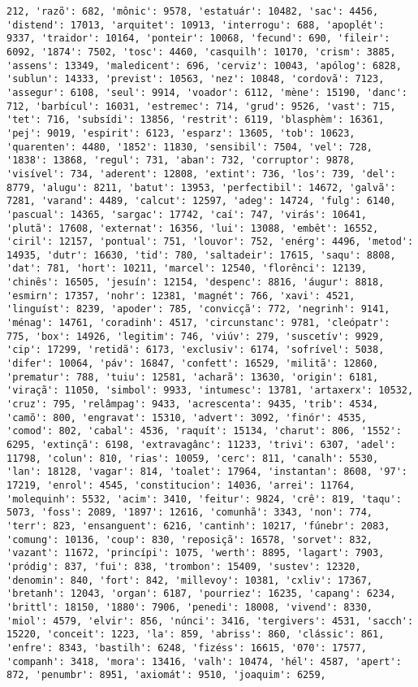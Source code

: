\begin{Verbatim}[commandchars=\\\{\}]
212, 'razõ': 682, 'mônic': 9578, 'estatuár': 10482, 'sac': 4456, 'distend': 17013, 'arquitet': 10913, 'interrogu': 688, 'apoplét': 9337, 'traidor': 10164, 'ponteir': 10068, 'fecund': 690, 'fileir': 6092, '1874': 7502, 'tosc': 4460, 'casquilh': 10170, 'crism': 3885, 'assens': 13349, 'maledicent': 696, 'cerviz': 10043, 'apólog': 6828, 'sublun': 14333, 'previst': 10563, 'nez': 10848, 'cordovã': 7123, 'assegur': 6108, 'seul': 9914, 'voador': 6112, 'mène': 15190, 'danc': 712, 'barbícul': 16031, 'estremec': 714, 'grud': 9526, 'vast': 715, 'tet': 716, 'subsídi': 13856, 'restrit': 6119, 'blasphèm': 16361, 'pej': 9019, 'espirit': 6123, 'esparz': 13605, 'tob': 10623, 'quarenten': 4480, '1852': 11830, 'sensibil': 7504, 'vel': 728, '1838': 13868, 'regul': 731, 'aban': 732, 'corruptor': 9878, 'visível': 734, 'aderent': 12808, 'extint': 736, 'los': 739, 'del': 8779, 'alugu': 8211, 'batut': 13953, 'perfectibil': 14672, 'galvã': 7281, 'varand': 4489, 'calcut': 12597, 'adeg': 14724, 'fulg': 6140, 'pascual': 14365, 'sargac': 17742, 'caí': 747, 'virás': 10641, 'plutã': 17608, 'externat': 16356, 'lui': 13088, 'embêt': 16552, 'ciril': 12157, 'pontual': 751, 'louvor': 752, 'enérg': 4496, 'metod': 14935, 'dutr': 16630, 'tid': 780, 'saltadeir': 17615, 'saqu': 8808, 'dat': 781, 'hort': 10211, 'marcel': 12540, 'florênci': 12139, 'chinês': 16505, 'jesuín': 12154, 'despenc': 8816, 'áugur': 8818, 'esmirn': 17357, 'nohr': 12381, 'magnét': 766, 'xavi': 4521, 'linguíst': 8239, 'apoder': 785, 'convicçã': 772, 'negrinh': 9141, 'ménag': 14761, 'coradinh': 4517, 'circunstanc': 9781, 'cleópatr': 775, 'box': 14926, 'legitim': 746, 'viúv': 279, 'suscetív': 9929, 'cip': 17299, 'retidã': 6173, 'exclusiv': 6174, 'sofrível': 5038, 'difer': 10064, 'páv': 16847, 'confett': 16529, 'militã': 12860, 'prematur': 788, 'tuiu': 12581, 'acharã': 13630, 'origin': 6181, 'viraçã': 11050, 'simbol': 9933, 'intumesc': 13781, 'artaxerx': 10532, 'cruz': 795, 'relâmpag': 9433, 'acrescenta': 9435, 'trib': 4534, 'camõ': 800, 'engravat': 15310, 'advert': 3092, 'finór': 4535, 'comod': 802, 'cabal': 4536, 'raquít': 15134, 'charut': 806, '1552': 6295, 'extinçã': 6198, 'extravagânc': 11233, 'trivi': 6307, 'adel': 11798, 'colun': 810, 'rias': 10059, 'cerc': 811, 'canalh': 5530, 'lan': 18128, 'vagar': 814, 'toalet': 17964, 'instantan': 8608, '97': 17219, 'enrol': 4545, 'constitucion': 14036, 'arrei': 11764, 'molequinh': 5532, 'acim': 3410, 'feitur': 9824, 'crê': 819, 'taqu': 5073, 'foss': 2089, '1897': 12616, 'comunhã': 3343, 'non': 774, 'terr': 823, 'ensanguent': 6216, 'cantinh': 10217, 'fúnebr': 2083, 'comung': 10136, 'coup': 830, 'reposiçã': 16578, 'sorvet': 832, 'vazant': 11672, 'princípi': 1075, 'werth': 8895, 'lagart': 7903, 'pródig': 837, 'fui': 838, 'trombon': 15409, 'sustev': 12320, 'denomin': 840, 'fort': 842, 'millevoy': 10381, 'cxliv': 17367, 'bretanh': 12043, 'organ': 6187, 'pourriez': 16235, 'capang': 6234, 'brittl': 18150, '1880': 7906, 'penedi': 18008, 'vivend': 8330, 'miol': 4579, 'elvir': 856, 'núnci': 3416, 'tergivers': 4531, 'sacch': 15220, 'conceit': 1223, 'la': 859, 'abriss': 860, 'clássic': 861, 'enfre': 8343, 'bastilh': 6248, 'fizéss': 16615, '070': 17577, 'companh': 3418, 'mora': 13416, 'valh': 10474, 'hél': 4587, 'apert': 872, 'penumbr': 8951, 'axiomát': 9510, 'joaquim': 6259, 
\end{Verbatim}
